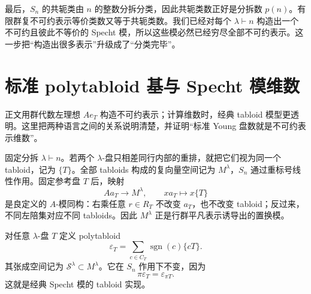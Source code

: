 最后，$S_n$ 的共轭类由 $n$ 的整数分拆分类，因此共轭类数正好是分拆数 $p(n)$。有限群复不可约表示等价类数又等于共轭类数。我们已经对每个 $\lambda\vdash n$ 构造出一个不可约且彼此不等价的 Specht 模，所以这些模必然已经穷尽全部不可约表示。这一步把“构造出很多表示”升级成了“分类完毕”。

\section{标准 polytabloid 基与 Specht 模维数}

正文用群代数左理想 $Ae_T$ 构造不可约表示；计算维数时，经典 tabloid 模型更透明。这里把两种语言之间的关系说明清楚，并证明“标准 Young 盘数就是不可约表示维数”。

固定分拆 $\lambda\vdash n$。若两个 $\lambda$-盘只相差同行内部的重排，就把它们视为同一个 tabloid，记为 $\{T\}$。全部 tabloids 构成的复向量空间记为 $M^\lambda$，$S_n$ 通过重标号线性作用。固定参考盘 $T$ 后，映射
\[
A a_T\longrightarrow M^\lambda,
\qquad
x a_T\longmapsto x\{T\}
\]
是良定义的 $A$-模同构：右乘任意 $r\in R_T$ 不改变 $a_T$，也不改变 tabloid；反过来，不同左陪集对应不同 tabloids。因此 $M^\lambda$ 正是行群平凡表示诱导出的置换模。

对任意 $\lambda$-盘 $T$ 定义 polytabloid
\begin{equation}
\varepsilon_T
=\sum_{c\in C_T}\operatorname{sgn}(c)\{cT\}.
\label{eq:polytabloid-app}
\end{equation}
其张成空间记为 $\mathscr S^\lambda\subset M^\lambda$。它在 $S_n$ 作用下不变，因为
\[
\pi\varepsilon_T=\varepsilon_{\pi T}.
\]
这就是经典 Specht 模的 tabloid 实现。

